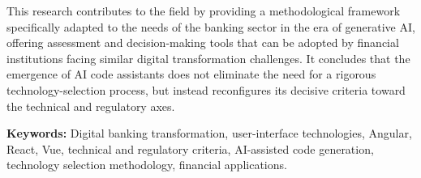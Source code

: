 This research contributes to the field by providing a methodological
framework specifically adapted to the needs of the banking sector in the era
of generative AI, offering assessment and decision-making tools that can be
adopted by financial institutions facing similar digital transformation
challenges. It concludes that the emergence of AI code assistants does not
eliminate the need for a rigorous technology-selection process, but instead
reconfigures its decisive criteria toward the technical and regulatory axes.

\vspace{0.5cm}
\noindent \textbf{Keywords:} Digital banking transformation, user-interface
technologies, Angular, React, Vue, technical and regulatory criteria,
AI-assisted code generation, technology selection methodology, financial
applications.

